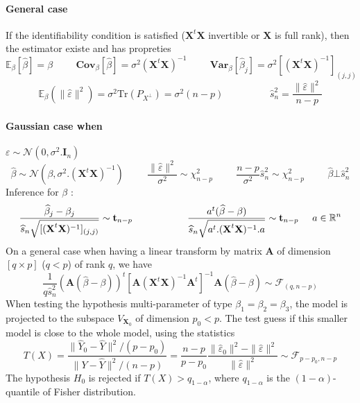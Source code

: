 \documentclass[a4paper,10pt]{article}
\begin{document}
\paragraph{General case} If the identifiability condition is satisfied ($\textbf{X}^t \textbf{X}$ invertible or $\textbf{X}$ is full rank), then the estimator existe and has propreties
\[
\mathbb{E}_{\beta}[\widehat{\beta}] = \beta
\hspace{1cm}
\textbf{Cov}_{\beta}[\widehat{\beta}] = \sigma^2 (\textbf{X}^t \textbf{X})^{-1}
\hspace{1cm}
\textbf{Var}_{\beta}[\widehat{\beta}_j] = \sigma^2 [(\textbf{X}^t \textbf{X})^{-1}]_{(j,j)}
\]
\[
\mathbb{E}_{\beta} (\|\widehat{\varepsilon}\|^2) = \sigma^2\text{Tr}(P_{X^\bot})=\sigma^2(n-p)
\hspace{2cm}
\widehat{s}^2_n = \frac{\|\widehat{\varepsilon}\|^2}{n-p}
\]

\paragraph{Gaussian case when } $\varepsilon \sim \mathcal{N}(0,\sigma^2.\textbf{I}_n)$
\[
\widehat{\beta} \sim \mathcal{N}(\beta,\sigma^2.(\textbf{X}^t \textbf{X})^{-1}) 
\hspace{1cm}
 \frac{\|\widehat{\varepsilon}\|^2}{\sigma^2} \sim \chi^2_{n-p}  
\hspace{1cm}
\frac{n-p}{\sigma^2} \widehat{s}^2_n \sim \chi^2_{n-p}  
\hspace{1cm} 
\widehat{\beta} \bot \widehat{s}^2_n 
\]
Inference for $\beta$ :
\[
\frac{\widehat{\beta}_j -\beta_j}{\widehat{s}_n \sqrt{[(\textbf{X}^t \textbf{X})^{-1}]_{(j,j)}}} \sim \textbf{t}_{n-p}
\hspace{2cm}
\frac{a^t(\widehat{\beta} -\beta)}{\widehat{s}_n \sqrt{a^t.(\textbf{X}^t \textbf{X})^{-1}.a}} \sim \textbf{t}_{n-p}
\hspace{5mm}
a \in \mathbb{R}^n
\]
On a general case when having a linear transform by matrix $\textbf{A}$ of dimension $[q\times p]$ ($q<p$) of rank $q$, we have
\[
\frac{1}{q\widehat{s}^2_n}
(\textbf{A}(\widehat{\beta} -\beta))^t 
[\textbf{A}  (\textbf{X}^t \textbf{X})^{-1} \textbf{A}^t]^{-1}
\textbf{A}(\widehat{\beta} -\beta)
\sim \mathcal{F}_{(q,n-p)}
\]
When testing the hypothesis multi-parameter of type $\beta_1 = \beta_2 = \beta_3$, the model is projected to the subspace $V_{\textbf{X}_0}$
of dimension $p_0<p$. The test guess if this smaller model is close to the whole model, using the statistics 
\[
T(X) = \frac{\| \widehat{Y}_0 -\widehat{Y} \|^2 / ( p-p_0 )}{\| Y -\widehat{Y} \|^2 / ( n-p )}  = 
\frac{n-p}{p-p_0}\frac{\| \widehat{\varepsilon}_0 \|^2 - \| \widehat{\varepsilon} \|^2 }{ \| \widehat{\varepsilon} \|^2} \sim
\mathcal{F}_{p-p_0,n-p}
\]
The hypothesis $H_0$ is rejected if $T(X) > q_{1-\alpha}$, where $q_{1-\alpha}$ is the $(1-\alpha)$-quantile of Fisher distribution. 
\end{document}
